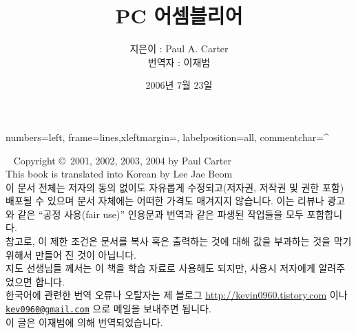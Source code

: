 \documentclass[a4paper,amsmath,footnote,hangul,10.5pt,chapter]{oblivoir}
\title{PC 어셈블리어}
\author{지은이 : Paul A. Carter\\ 번역자 : 이재범}
\date{2006년 7월 23일}
\begin{document}
\maketitle\thispagestyle{empty}

\newlength{\AsmMargin}
\setlength{\AsmMargin}{0em}
{numbers=left, frame=lines,xleftmargin=\AsmMargin, labelposition=all, commentchar=^ }

\newcommand{\MarginNote}[1]{\marginpar{\sffamily \small #1}}

\newpage
\thispagestyle{empty}
~\vfill
\noindent Copyright \copyright\  2001, 2002, 2003, 2004 by Paul Carter\\
\noindent This book is translated into Korean by Lee Jae Beom \\

\noindent 
이 문서 전체는 저자의 동의 없이도 자유롭게 수정되고(저자권, 저작권 및 권한 포함) 배포될 수 있으며
문서 자체에는 어떠한 가격도 매겨지지 않습니다. 이는 리뷰나 광고와 같은 ``공정 사용(fair use)'' 인용문과
번역과 같은 파생된 작업들을 모두 포함합니다. \\

\noindent 
참고로, 이 제한 조건은 문서를 복사 혹은 출력하는 것에 대해 값을 부과하는 것을 막기 위해서
만들어 진 것이 아닙니다.\\

\noindent 지도 선생님들 께서는 이 책을 학습 자료로 사용해도 되지만, 
사용시 저자에게 알려주었으면 합니다.\\

\noindent 한국어에 관련한 번역 오류나 오탈자는 제 블로그 {\url{http://kevin0960.tistory.com}} 이나
{\texttt{\href{mailto:kev0960@gmail.com}{kev0960@gmail.com}}} 으로 메일을 보내주면 됩니다. \\

\noindent 이 글은 이재범에 의해 번역되었습니다. 

\frontmatter


\mainmatter







%
\begin{appendix}

\end{appendix}
\clearpage
\ifpdf
{} %
\fi
{}
\printindex
\end{document}
